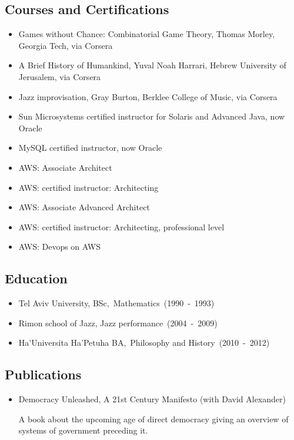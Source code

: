 \documentclass[
]{article}
\providecommand{\tightlist}{%
  \setlength{\itemsep}{0pt}\setlength{\parskip}{0pt}}
\begin{document}
\subsection{Courses and
Certifications}\label{courses-and-certifications}

\begin{itemize}
\tightlist
\item
  Games without Chance: Combinatorial Game Theory, Thomas Morley,
  Georgia Tech, via Corsera
\item
  A Brief History of Humankind, Yuval Noah Harrari, Hebrew University of
  Jerusalem, via Corsera
\item
  Jazz improvisation, Gray Burton, Berklee College of Music, via Corsera
\item
  Sun Microsystems certified instructor for Solaris and Advanced Java,
  now Oracle
\item
  MySQL certified instructor, now Oracle
\item
  AWS: Associate Architect
\item
  AWS: certified instructor: Architecting
\item
  AWS: Associate Advanced Architect
\item
  AWS: certified instructor: Architecting, professional level
\item
  AWS: Devops on AWS
\end{itemize}

\subsection{Education}\label{education}

\begin{itemize}
\tightlist
\item
  Tel Aviv University, BSc,~Mathematics~(1990~-~1993)
\item
  Rimon school of Jazz, Jazz performance~(2004~-~2009)
\item
  Ha'Universita Ha'Petuha BA,~Philosophy and History~(2010~-~2012)
\end{itemize}

\subsection{Publications}\label{publications}

\begin{itemize}
\item
  Democracy Unleashed, A 21st Century Manifesto (with David Alexander)

  A book about the upcoming age of direct democracy giving an overview
  of systems of government preceding it.
\end{itemize}
\end{document}
